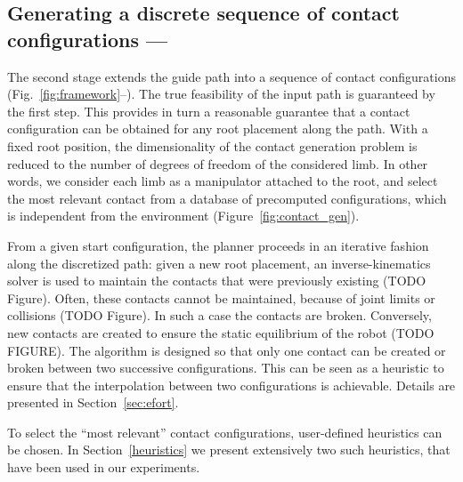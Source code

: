 \subsection{Generating a discrete sequence of contact configurations --- \Pb}

The second stage extends the guide path into a sequence of contact configurations (Fig.~\ref{fig:framework}--\Pb). The true feasibility of the input path is guaranteed by the first step.
This provides in turn a reasonable  guarantee that a contact configuration can be obtained for any root placement along the path. With a fixed root position, the dimensionality of the 
contact generation problem is reduced to the number of degrees of freedom of the considered limb. In other words, we consider each limb as a manipulator attached to the root, and select the most relevant contact from a database of precomputed configurations, which is independent from the environment (Figure~\ref{fig:contact_gen}).

From a given start configuration, the planner proceeds in an iterative fashion along the discretized path: given a new root placement, an inverse-kinematics solver 
is used to maintain the contacts that were previously existing (TODO Figure). Often, these contacts cannot be maintained, because of joint limits or collisions (TODO Figure).
In such a case the contacts are broken. Conversely, new contacts are created to ensure the static equilibrium of the robot (TODO FIGURE).
The algorithm is designed so that only one contact can be created or broken between two successive configurations. This can be seen as a heuristic  to ensure
that the interpolation between two configurations is achievable.
Details are presented in Section~\ref{sec:efort}. 

To select the ``most relevant'' contact configurations, user-defined heuristics can be chosen. In Section~\ref{heuristics} we present extensively two such heuristics, that have been
used in our experiments.



